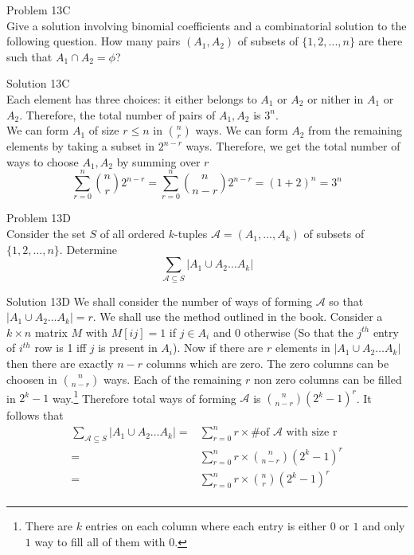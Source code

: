 \documentclass{tufte-book}
\begin{document}
\begin{tcolorbox}[colback=red!5!white]
	\large{Problem 13C}\\
	Give a solution involving binomial coefficients and
	a combinatorial solution to the following question. How many pairs
	$(A_1, A_2)$ of subsets of $\{1, 2,...,n\}$ are there such that $A_1 \cap A_2 = \phi$?
\end{tcolorbox}\noindent
\large{Solution 13C}\\
Each element has three choices: it either belongs to $A_1$ or $A_2$ or nither in $A_1$ or $A_2$. Therefore, the total number of pairs of $A_1,A_2$ is $3^n$.\\
We can form $A_1$ of size $r\leq n$ in $n\choose r $ ways. We can form $A_2$ from the remaining elements by taking a subset in $2^{n-r}$ ways. Therefore, we get the total number of ways to choose $A_1,A_2$ by summing over $r$
$$\sum_{r=0}^{n}{n\choose r}2^{n-r}=\sum_{r=0}^{n}{n\choose n-r}2^{n-r}=(1+2)^n=3^n$$
\begin{tcolorbox}[colback=red!5!white]
	\large{Problem 13D}\\
	Consider the set $S$ of all ordered $k$-tuples ${\mathcal A=
(A_1,...,A_k)}$ of subsets of $\{1, 2,...,n\}$. Determine
$$\sum_{\mathcal A\subseteq S}|A_1\cup A_2\hdots A_k|$$
\end{tcolorbox}\noindent
\large{Solution 13D}
We shall consider the number of ways of forming $\mathcal{A}$ so that $|A_1\cup A_2\hdots A_k|=r$. We shall use the method outlined in the book. Consider a $k\times n$ matrix $M$ with $M[ij]=1$ if $j\in A_i$ and 0 otherwise (So that the $j^{th}$ entry of $i^{th}$ row is 1 iff $j$ is present in $A_i$). Now if there are $r$ elements in $|A_1\cup A_2\hdots A_k|$ then there are exactly $n-r$ columns which are zero. The zero columns can be choosen in ${n}\choose n-r$ ways. Each of the remaining $r$ non zero columns can be filled in $2^k-1$ way.\footnote{ There are $k$ entries on each column where each entry is either $0$ or $1$ and only $1$ way to fill all of them with $0$. } Therefore total ways of forming $\mathcal A$ is ${n\choose n-r}(2^k-1)^r$. It follows that 
\begin{align*}
	\sum_{\mathcal A\subseteq S}|A_1\cup A_2\hdots A_k|=&\sum_{r=0}^n r\times\text{\# of $\mathcal{A}$ with size r}\\
	=&\sum_{r=0}^nr\times {n\choose n-r}(2^k-1)^r\\
	=&\sum_{r=0}^nr\times {n\choose r}(2^k-1)^r\\
\end{align*}
\end{document}
